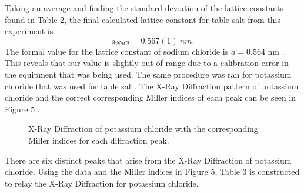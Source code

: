 \documentclass[twocolumn]{article}
\begin{document}
\newline
Taking an average and finding the standard deviation of the lattice constants found in Table 2, the final calculated lattice constant for table salt from this experiment is
\begin{equation}
a_{NaCl}=0.567(1) \ nm.
\end{equation}
The formal value for the lattice constant of sodium chloride is $a=0.564$ nm \cite{WikiLattice}. This reveals that our value is slightly out of range due to a calibration error in the equipment that was being used. The same procedure was ran for potassium chloride that was used for table salt. The X-Ray Diffraction pattern of potassium chloride and the correct corresponding Miller indices of each peak can be seen in Figure 5 \cite{Lin}.
\begin{figure}[htbp]
\begin{center}
\label{Fig4}
\caption{X-Ray Diffraction of potassium chloride with the corresponding Miller indices for each diffraction peak.}
\end{center}
\end{figure}
\newline
There are six distinct peaks that arise from the X-Ray Diffraction of potassium chloride. Using the data and the Miller indices in Figure 5, Table 3 is constructed to relay the X-Ray Diffraction for potassium chloride.
\end{document}
